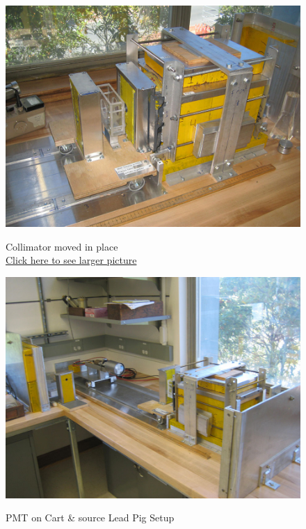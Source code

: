 \documentclass{../lab}
\begin{document}
\begin{figure}[H]
  \href{http://experimentationlab.berkeley.edu/sites/default/files/images/GMA_Layout_3538-Lg.jpg}{\includegraphics[width=\linewidth,keepaspectratio]{images/GMA_Layout_3538-Lg.jpg}}
  \caption{Collimator moved in place \\ \href{http://experimentationlab.berkeley.edu/sites/default/files/images/GMA_Layout_3538-Lg.jpg}{Click here to see larger picture}}
  \label{fig:CollimatorMovedIn}
\endminipage\hfill
{}
  \href{http://experimentationlab.berkeley.edu/sites/default/files/images/GMA_PMT_3519-Lg.jpg}{\includegraphics[width=\linewidth,keepaspectratio]{images/GMA_PMT_3519-Lg.jpg}}
  \caption{PMT on Cart \& source Lead Pig Setup \\
}
\end{figure}
\end{document}
